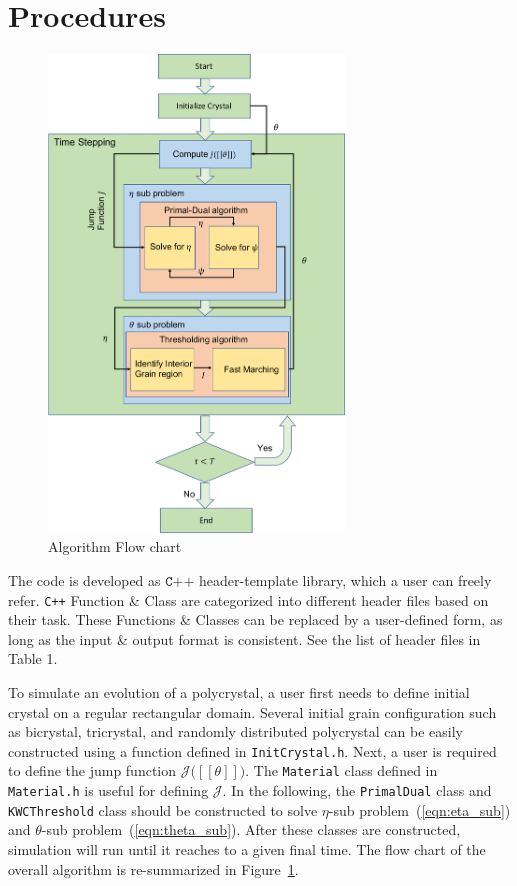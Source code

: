 \documentclass[11pt]{article}
\begin{document}
\section{Procedures}

\begin{figure}
\begin{center}
\includegraphics[width=0.7\textwidth]{Figures/flowChart.pdf}
\end{center}
\caption{Algorithm Flow chart}
\label{fig:flow_chart}
\end{figure}

The code is developed as $\texttt{C++}$ header-template library,
which a user can freely refer. 
\texttt{C++} Function \& Class are categorized into different header
files based on their task. 
These Functions \& Classes can be replaced by a user-defined form, 
as long as the input \& output format is consistent. 
See the list of header files in Table 1. 

To simulate an evolution of a polycrystal, a user first needs to define 
initial crystal on a regular rectangular domain.  
Several initial grain configuration 
such as bicrystal, tricrystal, and randomly distributed polycrystal
can be easily constructed using a function defined in \texttt{InitCrystal.h}.
Next, a user is required to define the jump function $\mathcal{J}\big( [\![\theta ]\!]\big)$.
The \texttt{Material} class defined in \texttt{Material.h} is useful for defining $\mathcal{J}$.
In the following, the \texttt{PrimalDual} class and 
\texttt{KWCThreshold} class should be constructed to
solve $\eta$-sub problem~(\ref{eqn:eta_sub}) and 
$\theta$-sub problem~(\ref{eqn:theta_sub}). 
After these classes are constructed, 
simulation will run until it reaches to a given final time. 
The flow chart of the overall algorithm is re-summarized 
in Figure~\ref{fig:flow_chart}. 
\end{document}

